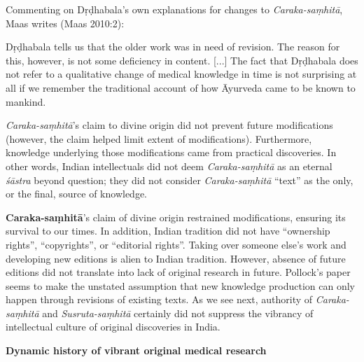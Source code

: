 Commenting on Dṛḍhabala's own explanations for changes to {\sl Caraka-saṃhitā}, Maas writes (Maas 2010:2): 
\begin{myquote}
Dṛḍhabala tells us that the older work was in need of revision. The reason for this, however, is not some deficiency in content. [...] The fact that Dṛḍhabala does not refer to a qualitative change of medical knowledge in time is not surprising at all if we remember the traditional account of how Āyurveda came to be known to mankind.
\end{myquote}

{\sl Caraka-saṃhitā}'s claim to divine origin did not prevent future modifications (however, the claim helped limit extent of modifications).  Furthermore, knowledge underlying those modifications came from practical discoveries.  In other words, Indian intellectuals did not deem {\sl Caraka-saṃhitā} as an eternal {\sl śāstra} beyond question; they did not consider {\sl Caraka-saṃhitā} ``text'' as the only, or the final, source of knowledge.

{\bf Caraka-saṃhitā}'s claim of divine origin restrained modifications, ensuring its survival to our times. In addition, Indian tradition did not have ``ownership rights'', ``copyrights'', or ``editorial rights''.  Taking over someone else's work and developing new editions is alien to Indian tradition.  However, absence of future editions did not translate into lack of original research in future.  Pollock's paper seems to make the unstated assumption that new knowledge production can only happen through revisions of existing texts. As we see next, authority of {\sl Caraka-saṃhitā} and {\sl Susruta-saṃhitā} certainly did not suppress the vibrancy of intellectual culture of original discoveries in India.

{\bf Dynamic history of vibrant original medical research}

